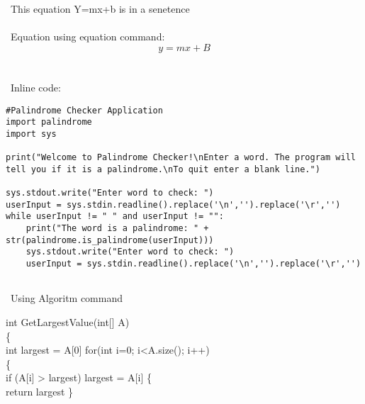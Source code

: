 \documentclass{article}
\begin{document}
\ This equation Y=mx+b is in a senetence\\\\
\ Equation using equation command:\\
\begin{equation}
	y=mx+B
\end{equation}
\\\\
\ Inline code: \\
\begin{lstlisting}
#Palindrome Checker Application
import palindrome
import sys

print("Welcome to Palindrome Checker!\nEnter a word. The program will tell you if it is a palindrome.\nTo quit enter a blank line.")

sys.stdout.write("Enter word to check: ")
userInput = sys.stdin.readline().replace('\n','').replace('\r','')
while userInput != " " and userInput != "":
	print("The word is a palindrome: " + str(palindrome.is_palindrome(userInput)))
	sys.stdout.write("Enter word to check: ")
	userInput = sys.stdin.readline().replace('\n','').replace('\r','')


\end{lstlisting}


\ Using Algoritm command
\begin{algorithm}
int GetLargestValue(int[] A)\\
\{\\
	int largest = A[0]\;
	for(int i=0; i<A.size(); i++)\\
	\{\\
		if (A[i] > largest)
			largest = A[i]\;
	\{\\
	
	return largest\;
\}	
\end{algorithm}
	
\end{document}
